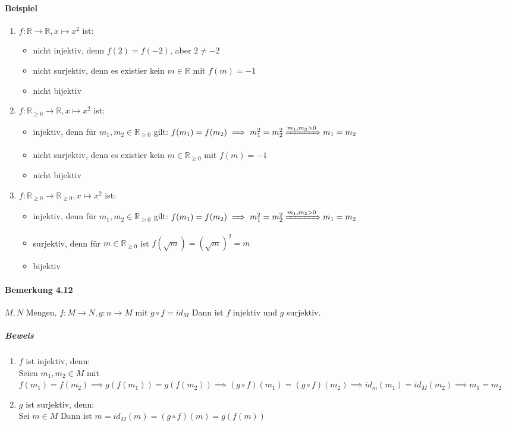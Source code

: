 \documentclass[a4paper]{scrartcl}
\theoremstyle{definition}
\theoremstyle{plain}
\theoremstyle{plain}
\theoremstyle{remark}
\theoremstyle{remark}
\theoremstyle{remark}
\theoremstyle{remark}
\theoremstyle{remark}
\begin{document}
\paragraph{Beispiel}
\label{sec-2-6-7-4}
\begin{enumerate}
\item $f:\mathbb{R}\to\mathbb{R},x\mapsto x^2$ ist:
\begin{itemize}
\item nicht injektiv, denn $f(2) = f(-2)$, aber $2\neq -2$
\item nicht surjektiv, denn es existier kein $m\in\mathbb{R}$ mit $f(m) = -1$
\item nicht bijektiv
\end{itemize}
\item $f:\mathbb{R}_{\geq 0} \to \mathbb{R}, x\mapsto x^2$ ist:
\begin{itemize}
\item injektiv, denn für $m_1,m_2 \in\mathbb{R}_{\geq 0}$ gilt: $f(m_1) = f(m_2) \implies m_1^2 = m_2^2 \xRightarrow{m_1,m_2 > 0} m_1 = m_2$
\item nicht surjektiv, denn es existier kein $m\in\mathbb{R}_{\geq 0}$ mit $f(m) = -1$
\item nicht bijektiv
\end{itemize}
\item $f:\mathbb{R}_{\geq 0} \to \mathbb{R}_{\geq 0}, x\mapsto x^2$ ist:
\begin{itemize}
\item injektiv, denn für $m_1,m_2 \in\mathbb{R}_{\geq 0}$ gilt: $f(m_1) = f(m_2) \implies m_1^2 = m_2^2 \xRightarrow{m_1,m_2 > 0} m_1 = m_2$
\item surjektiv, denn für $m\in\mathbb{R}_{\geq 0}$ ist $f(\sqrt{m}) = (\sqrt{m})^2 = m$
\item bijektiv
\end{itemize}
\end{enumerate}
\paragraph{Bemerkung 4.12}
\label{sec-2-6-7-5}
$M,N$ Mengen, $f:M\to N, g:n\to M$ mit $g\circ f = id_M$
Dann ist $f$ injektiv und $g$ surjektiv.
\subparagraph{Beweis}
\label{sec-2-6-7-5-1}
\begin{enumerate}
\item $f$ ist injektiv, denn: \\
         Seien $m_1, m_2 \in M$ mit $f(m_1) = f(m_2) \implies g(f(m_1)) = g(f(m_2)) \implies (g\circ f)(m_1) = (g\circ f)(m_2) \implies id_m(m_1) = id_M(m_2)\implies m_1 = m_2$
\item $g$ ist surjektiv, denn: \\
         Sei $m\in M$ Dann ist $m=id_M(m) = (g\circ f)(m) = g(f(m))$
\end{enumerate}
\end{document}

